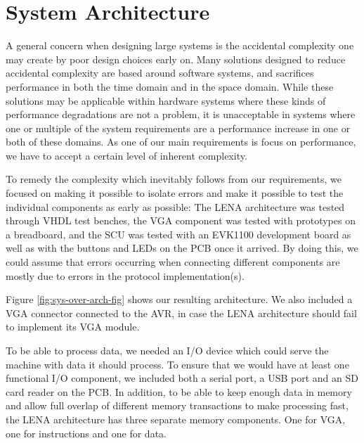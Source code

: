 \section{System Architecture}

A general concern when designing large systems is the accidental
complexity\cite[p.~8-9]{holt2004uml} one may create by poor design choices early
on. Many solutions designed to reduce accidental complexity are based around
software systems, and sacrifices performance in both the time domain and in the
space domain\cite{moseley2006out}. While these solutions may be applicable
within hardware systems where these kinds of performance degradations are not a
problem, it is unacceptable in systems where one or multiple of the system
requirements are a performance increase in one or both of these domains. As one
of our main requirements is focus on performance, we have to accept a certain
level of inherent complexity.


To remedy the complexity which inevitably follows from our requirements, we
focused on making it possible to isolate errors and make it possible to test
the individual components as early as possible: The \ac{LENA} architecture was
tested through \ac{VHDL} test benches, the \ac{VGA} component was tested with
prototypes on a breadboard, and the \ac{SCU} was tested with an EVK1100 development
board as well as with the buttons and \ac{LED}s on the PCB once it arrived.
By doing this, we could assume that errors occurring when connecting different
components are mostly due to errors in the protocol implementation(s).

Figure \ref{fig:sys-over-arch-fig} shows our resulting architecture. We also included a
\ac{VGA} connector connected to the AVR, in case the \ac{LENA} architecture
should fail to implement its \ac{VGA} module.

To be able to process data, we needed an \ac{I/O} device which could serve the machine
with data it should process. To ensure that we would have at least one
functional \ac{I/O} component, we included both a serial
port, a \ac{USB} port and an \ac{SD} card reader on the \ac{PCB}. In addition,
to be able to keep enough data in memory and allow full overlap of different memory
transactions to make processing fast, the \ac{LENA} architecture has three separate
memory components. One for \ac{VGA}, one for instructions and one for data.
